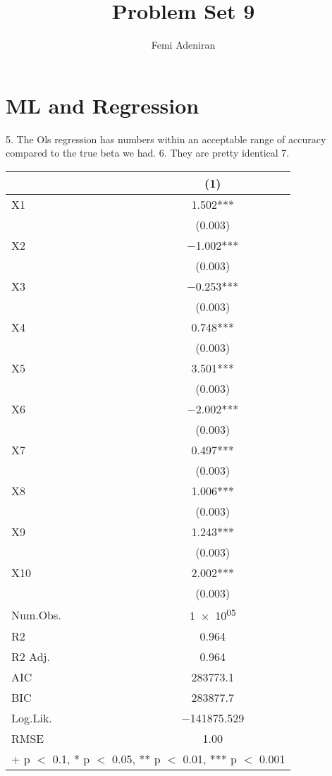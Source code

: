 \documentclass{article}
\title{Problem Set 9}
\author{Femi Adeniran}
\begin{document}
\maketitle

\begin{abstract}

\end{abstract}

\section{ML and Regression}

5. The Ols regression has numbers within an acceptable range of accuracy compared to the true beta we had.
6. They are pretty identical 
7.


\begin{table}
\centering
\begin{tabular}[t]{lc}
\toprule
  & (1)\\
\midrule
X1 & \num{1.502}***\\
 & \vphantom{9} (\num{0.003})\\
X2 & \num{-1.002}***\\
 & \vphantom{8} (\num{0.003})\\
X3 & \num{-0.253}***\\
 & \vphantom{7} (\num{0.003})\\
X4 & \num{0.748}***\\
 & \vphantom{6} (\num{0.003})\\
X5 & \num{3.501}***\\
 & \vphantom{5} (\num{0.003})\\
X6 & \num{-2.002}***\\
 & \vphantom{4} (\num{0.003})\\
X7 & \num{0.497}***\\
 & \vphantom{3} (\num{0.003})\\
X8 & \num{1.006}***\\
 & \vphantom{2} (\num{0.003})\\
X9 & \num{1.243}***\\
 & \vphantom{1} (\num{0.003})\\
X10 & \num{2.002}***\\
 & (\num{0.003})\\
\midrule
Num.Obs. & \num{1e+05}\\
R2 & \num{0.964}\\
R2 Adj. & \num{0.964}\\
AIC & \num{283773.1}\\
BIC & \num{283877.7}\\
Log.Lik. & \num{-141875.529}\\
RMSE & \num{1.00}\\
\bottomrule
\multicolumn{2}{l}{\rule{0pt}{1em}+ p $<$ 0.1, * p $<$ 0.05, ** p $<$ 0.01, *** p $<$ 0.001}\\
\end{tabular}
\end{table}
\end{document}
